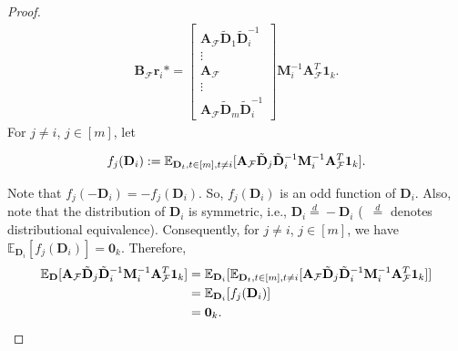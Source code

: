\documentclass[journal,draftcls,onecolumn]{IEEEtran}
\theoremstyle{mystyle}
\newcommand{\bfD}{\mathbf{D}}
\newcommand{\bfA}{\mathbf{A}}
\newcommand{\bfM}{\mathbf{M}}
\newcommand{\cF}{\mathcal{F}}
\newcommand{\sifat}[1]{\marginpar{+}{\bf Sifat's remark}: {\em #1}}
\begin{document}
\begin{proof}

\begin{align*}
\mathbf{B}_{\mathcal{F}}\mathbf{r}_i* = \begin{bmatrix} \mathbf{A}_{\cF} \tilde{\bfD}_1\tilde{\mathbf{D}}_i^{-1} \\ \vdots\\ \bfA_{\cF}\\ \vdots \\  \mathbf{A}_{\cF} \tilde{\bfD}_m\tilde{\mathbf{D}}_i^{-1} \end{bmatrix} \bfM_i^{-1}\mathbf{A}_{\cF}^T \mathbf{1}_k.
\end{align*}
For $j \ne i$, $j \in [m]$, let 

\begin{equation}
f_j(\mathbf{D}_i)  := \mathbb{E}_{\mathbf{D}_t, t \in [m], t \ne i}[ \mathbf{A}_{\cF} \tilde{\bfD}_j\tilde{\bf{D}}_i^{-1}\bfM_i^{-1}\mathbf{A}_{\cF}^T \mathbf{1}_k].
\end{equation}

Note that  
$f_j(-\mathbf{D}_i) = - f_j(\mathbf{D}_i)$.
So, $f_j(\mathbf{D}_i)$ is an odd function of $\mathbf{D}_i$. Also, note that the distribution of $\mathbf{D}_i$ is symmetric, i.e., $\bfD_i \overset{d}= - \bfD_i$ (~$\overset{d}=$ denotes distributional equivalence). Consequently, for $j \ne i$, $j \in [m]$, we have $\mathbb{E}_{\mathbf{D}_i}[f_j(\mathbf{D}_i)] = \mathbf{0}_k$. Therefore, 
\begin{align*}\mathbb{E}_{\mathbf{D}} [ \mathbf{A}_{\cF} \tilde{\bfD}_j\tilde{\bf{D}}_i^{-1}\bfM_i^{-1}\mathbf{A}_{\cF}^T \mathbf{1}_k] &= \mathbb{E}_{\mathbf{D}_i}[\mathbb{E}_{\mathbf{D}_t, t \in [m], t \ne i}[ \mathbf{A}_{\cF} \tilde{\bfD}_j\tilde{\bf{D}}_i^{-1}\bfM_i^{-1}\mathbf{A}_{\cF}^T \mathbf{1}_k]]\\
&= \mathbb{E}_{\mathbf{D}_i}[f_j(\mathbf{D}_i)] \\
&=  \mathbf{0}_{k}. 
\end{align*}


\end{proof}
\end{document}
